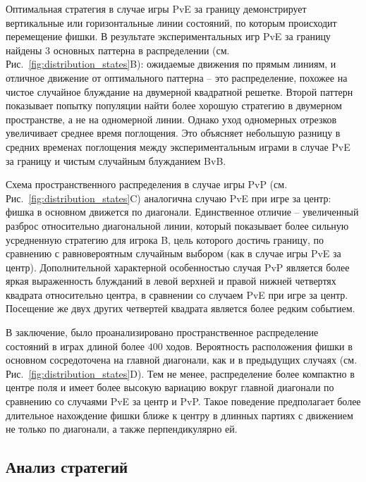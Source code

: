 Оптимальная стратегия в случае игры PvE за границу демонстрирует вертикальные или горизонтальные линии состояний, 
по которым происходит перемещение фишки. В результате экспериментальных игр PvE за границу найдены 
3 основных паттерна в распределении (см. Рис.~\cref{fig:distribution_states}B): ожидаемые движения по прямым линиям, и 
отличное движение от оптимального паттерна -- это распределение, похожее на чистое случайное блуждание на двумерной квадратной решетке. 
Второй паттерн показывает попытку популяции найти более хорошую стратегию в двумерном пространстве, а не на одномерной линии. 
Однако уход одномерных отрезков увеличивает среднее время поглощения. Это объясняет небольшую разницу в средних временах 
поглощения между экспериментальным играми в случае PvE за границу и чистым случайным блужданием BvB.

Схема пространственного распределения в случае игры PvP (см. Рис.~\cref{fig:distribution_states}C) аналогична случаю PvE при игре за центр: 
фишка в основном движется по диагонали. Единственное отличие -- увеличенный разброс относительно диагональной линии, 
который показывает более сильную усредненную стратегию для игрока B, цель которого достичь границу, 
по сравнению с равновероятным случайным выбором (как в случае игры PvE за центр).
Дополнительной характерной особенностью случая PvP является более яркая выраженность
блужданий в левой верхней и правой нижней четвертях квадрата относительно центра, в сравнении со случаем PvE при игре за центр.
Посещение же двух других четвертей квадрата является более редким событием.

В заключение, было проанализировано пространственное распределение состояний в играх длиной более $400$ ходов. 
Вероятность расположения фишки в основном сосредоточена на главной диагонали, как и в предыдущих случаях (см. Рис.~\cref{fig:distribution_states}D). 
Тем не менее, распределение более компактно в центре поля и имеет более высокую вариацию вокруг главной диагонали 
по сравнению со случаями PvE за центр и PvP. Такое поведение предполагает более длительное нахождение фишки ближе к центру 
в длинных партиях с движением не только по диагонали, а также перпендикулярно ей.


\subsection{Анализ стратегий}\label{sec:ch3/sec3/sub4}

